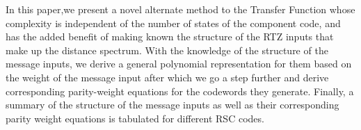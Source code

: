 
In this paper,we present a novel alternate method to the Transfer Function whose complexity is independent of the number of states of the component code, and has the added benefit of making known the structure of the RTZ inputs that make up the distance spectrum.
With the knowledge of the structure of the message inputs, we derive a general polynomial representation for them based on the weight of the message input after which we go a step further and derive corresponding parity-weight equations for the codewords they generate. Finally, a summary of the structure of the message inputs as well as their corresponding parity weight equations is tabulated for different RSC codes.

